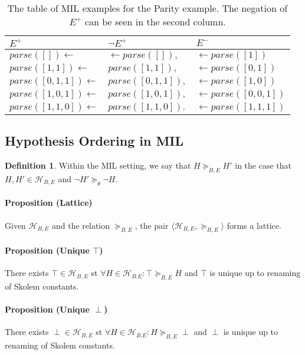 \documentclass{article}
\theoremstyle{plain}
\theoremstyle{definition}
\newtheorem{defn}[thm]{Definition} %
\begin{document}
\begin{multicols}{2}
\begin{table}[H]
\begin{tabular}{ | l | l | l | }
\hline
$E^+$ & $\lnot E^+$ & $E^-$ \\
\hline

$parse([]) \leftarrow$ & $\leftarrow parse([]),$ & $\leftarrow parse([1])$ \\
$parse([1, 1]) \leftarrow$ & $parse([1, 1]),$ & $\leftarrow parse([0, 1])$ \\
$parse([0, 1, 1]) \leftarrow$ & $parse([0, 1, 1]),$ & $\leftarrow parse([1, 0])$ \\
$parse([1, 0, 1]) \leftarrow$ & $parse([1, 0, 1]),$ & $\leftarrow parse([0, 0, 1])$ \\
$parse([1, 1, 0]) \leftarrow$ & $parse([1, 1, 0]).$ & $\leftarrow parse([1, 1, 1])$ \\

\hline
\end{tabular}
\caption{The table of MIL examples for the Parity example. The negation of $E^+$ can be seen in the second column.}
\end{table}

\subsection{Hypothesis Ordering in MIL}

\begin{defn}Within the MIL setting, we say that $H \succeq_{B,E} H'$ in the case that $H, H' \in \mathcal{H}_{B,E}$ and $\lnot H' \succeq_\theta \lnot H$.\end{defn}

\paragraph{Proposition (Lattice)} Given $\mathcal{H}_{B,E}$ and the relation $\succeq_{B,E}$, the pair $\langle \mathcal{H}_{B,E}, \succeq_{B,E} \rangle$ forms a lattice.

\paragraph{Proposition (Unique $\top$)} There exists $\top \in \mathcal{H}_{B,E}$ st $\forall H \in \mathcal{H}_{B.E}: \top \succeq_{B,E} H$ and $\top$ is unique up to renaming of Skolem constants.

\paragraph{Proposition (Unique $\perp$)} There exists $\perp \in \mathcal{H}_{B,E}$ st $\forall H \in \mathcal{H}_{B.E}: H \succeq_{B,E} \perp$ and $\perp$ is unique up to renaming of Skolem constants.


\end{multicols}
\end{document}
